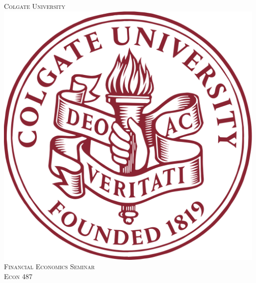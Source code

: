 

\begin{titlepage}

\newcommand{\HRule}{\rule{\linewidth}{0.5mm}} %

\center %
 

\textsc{\LARGE Colgate University}\\[1.5cm] %
\includegraphics[scale=.1]{Paper/secondary/colgate_logo.png}\\[1cm] %
\textsc{\Large Financial Economics Seminar}\\[0.5cm] %
\textsc{\large Econ 487}\\[0.5cm] %



\end{titlepage}
